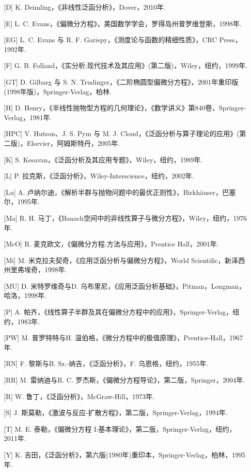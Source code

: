 \documentclass[10pt,b5paper,openany,twoside]{ctexbook}
\begin{document}
[D] K. Deimling，《非线性泛函分析》，Dover，2010年.

[E] L. C. Evans，《偏微分方程》，美国数学学会，罗得岛州普罗维登斯，1998年.

[EG] L. C. Evans 与 R. F. Gariepy，《测度论与函数的精细性质》，CRC Press，1992年.

[F] G. B. Folland，《实分析:现代技术及其应用》(第二版)，Wiley，纽约，1999年.

[GT] D. Gilbarg 与 S. N. Trudinger，《二阶椭圆型偏微分方程》，2001年重印版(1998年版)，Springer-Verlag，柏林.

[H] D. Henry，《半线性抛物型方程的几何理论》，《数学讲义》第840卷，Springer-Verlag，1981年.

[HPC] V. Hutson、J. S. Pym 与 M. J. Cloud，《泛函分析与算子理论的应用》(第二版)，Elsevier，阿姆斯特丹，2005年.

[K] S. Kesavan，《泛函分析及其应用专题》，Wiley，纽约，1989年.

[L] P. 拉克斯，《泛函分析》，Wiley-Interscience，纽约，2002年.

[Lu] A. 卢纳尔迪，《解析半群与抛物问题中的最优正则性》，Birkhäuser，巴塞尔，1995年.

[Ma] R. H. 马丁，《Banach空间中的非线性算子与微分方程》，Wiley，纽约，1976年.

[McO] R. 麦克欧文，《偏微分方程:方法与应用》，Prentice Hall，2001年.

[Mi] M. 米克拉夫契奇，《应用泛函分析与偏微分方程》，World Scientific，新泽西州里弗埃奇，1998年.

[MU] D. 米特罗维奇与D. 乌布里尼，《应用泛函分析基础》，Pitman，Longman，哈洛，1998年.

[P] A. 帕齐，《线性算子半群及其在偏微分方程中的应用》，Springer-Verlag，纽约，1983年.

[PW] M. 普罗特特与H. 温伯格，《微分方程中的极值原理》，Prentice-Hall，1967年.

[RN] F. 黎斯与B. Sz.-纳吉，《泛函分析》，F. 乌恩格，纽约，1955年.

[RR] M. 雷纳迪与R. C. 罗杰斯，《偏微分方程导论》，第二版，Springer，2004年.

[R] W. 鲁丁，《泛函分析》，McGraw-Hill，1973年.

[S] J. 斯莫勒，《激波与反应-扩散方程》，第二版，Springer-Verlag，1994年.

[T] M. E. 泰勒，《偏微分方程 I:基本理论》，第二版，Springer-Verlag，纽约，2011年.

[Y] K. 吉田，《泛函分析》，第六版(1980年)重印本，Springer-Verlag，柏林，1995年.
\end{document}
